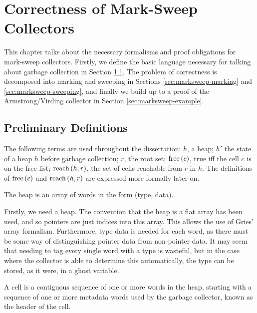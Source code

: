 \chapter{Correctness of Mark-Sweep Collectors}
\label{sec:marksweep}

This chapter talks about the necessary formalisms and proof
obligations for mark-sweep collectors. Firstly, we define the basic
language necessary for talking about garbage collection in Section
\ref{sec:marksweep-defns}. The problem of correctness is decomposed
into marking and sweeping in Sections \ref{sec:marksweep-marking} and
\ref{sec:marksweep-sweeping}, and finally we build up to a proof of
the Armstrong/Virding\cite{Armstrong95} collector in Section
\ref{sec:marksweep-example}.

\section{Preliminary Definitions}
\label{sec:marksweep-defns}

The following terms are used throughout the dissertation: $h$, a heap;
$h'$ the state of a heap $h$ before garbage collection; $r$, the root
set; $\mathrm{free}\left(c\right)$, true iff the cell $c$ is on the free list;
$\mathrm{reach}\left(h, r\right)$, the set of cells reachable from $r$ in $h$. The
definitions of $\mathrm{free}\left(c\right)$ and $\mathrm{reach}\left(h, r\right)$ are expressed more
formally later on.

\begin{definition}[Heap]
  \label{def:ms-heap}
  The heap is an array of words in the form (type, data).
\end{definition}

Firstly, we need a heap. The convention that the heap is a flat array
has been used, and so pointers are just indices into this array. This
allows the use of Gries' array formalism\cite{Gries87}. Furthermore,
type data is needed for each word, as there must be some way of
distinguishing pointer data from non-pointer data. It may seem that
needing to tag every single word with a type is wasteful, but in the
case where the collector is able to determine this automatically, the
type can be stored, as it were, in a ghost variable.

\begin{definition}[Cell]
  \label{def:ms-cell}
  A cell is a contiguous sequence of one or more words in the heap,
  starting with a sequence of one or more metadata words used by the
  garbage collector, known as the header of the cell.
\end{definition}

